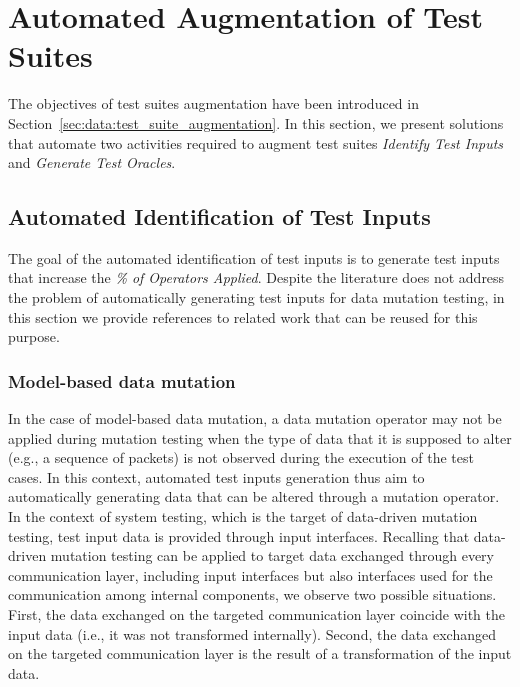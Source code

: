 
\section{Automated Augmentation of Test Suites}
\label{sec:testGenerationData}

The objectives of test suites augmentation have been introduced in Section~\ref{sec:data:test_suite_augmentation}.
In this section, we present solutions that automate two activities required to augment test suites
\emph{Identify Test Inputs} and \emph{Generate Test Oracles}.

\subsection{Automated Identification of Test Inputs}

The goal of the automated identification of test inputs is to generate test inputs that increase the \emph{\% of Operators Applied}. Despite the literature does not address the problem of automatically generating test inputs for data mutation testing, in this section we provide references to related work that can be reused for this purpose.

\subsubsection{Model-based data mutation}

In the case of model-based data mutation, a data mutation operator may not be applied during mutation testing when the type of data that it is supposed to alter (e.g., a sequence of packets) is not observed during the execution of the test cases. In this context, automated test inputs generation thus aim to automatically generating data that can be altered through a mutation operator. In the context of system testing, which is the target of data-driven mutation testing, test input data is provided through input interfaces.
Recalling that data-driven mutation testing can be applied to target data exchanged through 
every communication layer, including input interfaces but also interfaces used for the communication among internal components, we observe two possible situations. First, the data exchanged on the targeted communication layer coincide with the input data (i.e., it was not transformed internally). Second, the data exchanged on the targeted communication layer is the result of a transformation of the input data. 

